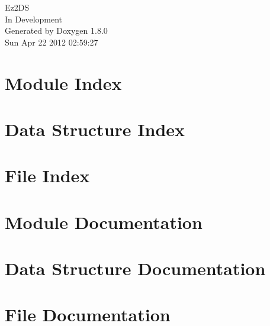 \documentclass{book}
\begin{document}
\hypersetup{pageanchor=false,citecolor=blue}
\begin{titlepage}
\vspace*{7cm}
\begin{center}
{\Large Ez2\-D\-S \\[1ex]\large In Development }\\
\vspace*{1cm}
{\large Generated by Doxygen 1.8.0}\\
\vspace*{0.5cm}
{\small Sun Apr 22 2012 02:59:27}\\
\end{center}
\end{titlepage}
\clearemptydoublepage
{}
\tableofcontents
\clearemptydoublepage
{}
\hypersetup{pageanchor=true,citecolor=blue}
\chapter{Module Index}

\chapter{Data Structure Index}

\chapter{File Index}

\chapter{Module Documentation}





\chapter{Data Structure Documentation}












\chapter{File Documentation}






\printindex
\end{document}
